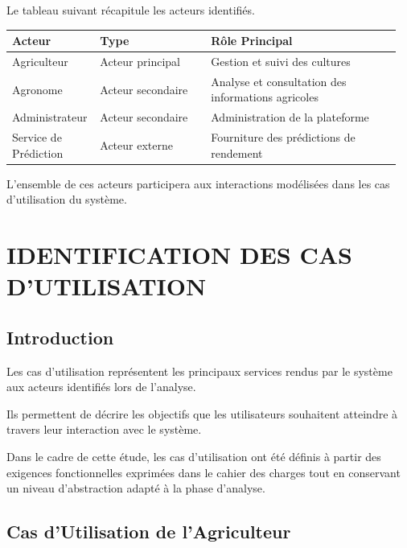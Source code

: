 Le tableau suivant récapitule les acteurs identifiés.

\begin{longtable}{@{}p{0.20\linewidth}p{0.28\linewidth}p{0.48\linewidth}@{}}
\toprule
\rowcolors{2}{gray!10}{white}
\textbf{Acteur} & \textbf{Type} & \textbf{Rôle Principal} \\
\midrule
\endhead
Agriculteur & Acteur principal & Gestion et suivi des cultures \\
Agronome & Acteur secondaire & Analyse et consultation des informations
agricoles \\
Administrateur & Acteur secondaire & Administration de la plateforme \\
Service de Prédiction & Acteur externe & Fourniture des prédictions de
rendement \\
\bottomrule
\end{longtable}

L'ensemble de ces acteurs participera aux interactions modélisées dans
les cas d'utilisation du système.

\hypertarget{chapitre-4-identification-des-cas-dutilisation}{%
\chapter{IDENTIFICATION DES CAS
D'UTILISATION}\label{chapitre-4-identification-des-cas-dutilisation}}

\hypertarget{introduction-1}{%
\section{Introduction}\label{introduction-1}}

Les cas d'utilisation représentent les principaux services rendus par le
système aux acteurs identifiés lors de l'analyse.

Ils permettent de décrire les objectifs que les utilisateurs souhaitent
atteindre à travers leur interaction avec le système.

Dans le cadre de cette étude, les cas d'utilisation ont été définis à
partir des exigences fonctionnelles exprimées dans le cahier des charges
tout en conservant un niveau d'abstraction adapté à la phase d'analyse.

\hypertarget{cas-dutilisation-de-lagriculteur}{%
\section{Cas d'Utilisation de
l'Agriculteur}\label{cas-dutilisation-de-lagriculteur}}

